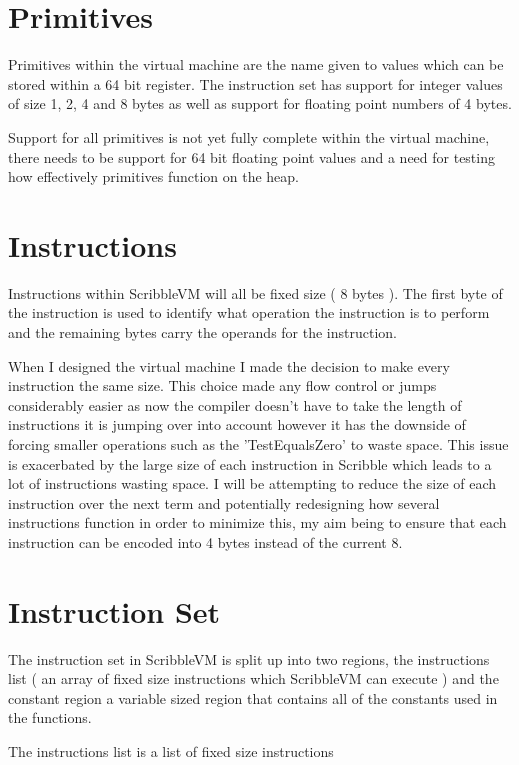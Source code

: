 \documentclass[]{final_report}
\begin{document}
\section{Primitives}

Primitives within the virtual machine are the name given to values which can be stored within a 64 bit register. The instruction set has support for integer values of size 1, 2, 4 and 8 bytes as well as support for floating point numbers of 4 bytes.

Support for all primitives is not yet fully complete within the virtual machine, there needs to be support for 64 bit floating point values and a need for testing how effectively primitives function on the heap.

\section{Instructions}

Instructions within ScribbleVM will all be fixed size ( 8 bytes ). The first byte of the instruction is used to
identify what operation the instruction is to perform and the remaining bytes carry the operands for the instruction.

When I designed the virtual machine I made the decision to make every instruction the same size. This choice made any flow control or jumps considerably easier as now the compiler doesn't have to take the length of instructions it is jumping over into account however it has the downside of forcing smaller operations such as the 'TestEqualsZero' to waste space. This issue is exacerbated by the large size of each instruction in Scribble which leads to a lot of instructions wasting space. I will be attempting to reduce the size of each instruction over the next term and potentially redesigning how several instructions function in order to minimize this, my aim being to ensure that each instruction can be encoded into 4 bytes instead of the current 8.

\section{Instruction Set}

The instruction set in ScribbleVM is split up into two regions, the instructions list ( an array of fixed size
instructions which ScribbleVM can execute ) and the constant region a variable sized region that contains all
of the constants used in the functions.

The instructions list is a list of fixed size instructions 
\end{document}
